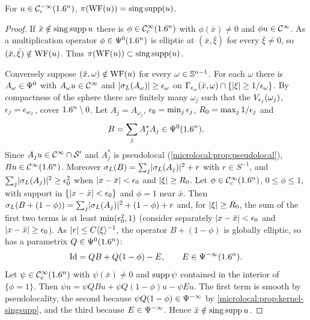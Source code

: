 \begin{proposition}\label{microlocal:prop:wf-singsupp}
  For $u\in\mathcal{C}^{-\infty}_{\mathrm{c}}(1.6^n)$, $\pi(\operatorname{WF}(u))=\operatorname{sing\,supp}(u)$.
\end{proposition}
\begin{proof}
  If $\bar x\notin\operatorname{sing\,supp} u$ there is $\phi\in\mathcal{C}^\infty_{\mathrm{c}}(1.6^n)$ with
  $\phi(\bar x)\ne0$ and $\phi u\in\mathcal{C}^\infty$. As a multiplication operator
  $\phi\in\Psi^{0}(1.6^n)$ is elliptic at $(\bar x,\bar\xi)$ for every
  $\bar\xi\ne0$, so $(\bar x,\bar\xi)\notin\operatorname{WF}(u)$. Thus
  $\pi(\operatorname{WF}(u))\subset\operatorname{sing\,supp}(u)$.

  Conversely suppose $(\bar x,\omega)\notin\operatorname{WF}(u)$ for every
  $\omega\in\mathbb{S}^{n-1}$. For each $\omega$ there is $A_\omega\in\Psi^{0}$
  with $A_\omega u\in\mathcal{C}^\infty$ and $\lvert \sigma_L(A_\omega)\rvert\ge\epsilon_\omega$ on
  $\Gamma_{\epsilon_\omega}(\bar x,\omega)\cap\{\lvert \xi\rvert\ge1/\epsilon_\omega\}$. By
  compactness of the sphere there are finitely many $\omega_j$ such that the
  $V_{\epsilon_j}(\omega_j)$, $\epsilon_j=\epsilon_{\omega_j}$, cover $1.6^n\setminus0$. Let
  $A_j=A_{\omega_j}$, $\epsilon_0=\min_j\epsilon_j$, $R_0=\max_j1/\epsilon_j$ and
  \begin{equation*}
    B=\sum_jA_j^*A_j\in\Psi^{0}(1.6^n).
  \end{equation*}
  Since $A_ju\in\mathcal{C}^\infty\cap\mathcal{S}'$ and $A_j^*$ is pseudolocal
  (\cref{microlocal:prop:pseudolocal}), $Bu\in\mathcal{C}^\infty(1.6^n)$. Moreover
  $\sigma_L(B)=\sum_j\lvert \sigma_L(A_j)\rvert^2+r$ with $r\in S^{-1}$, and
  $\sum_j\lvert \sigma_L(A_j)\rvert^2\ge\epsilon_0^2$ when $\lvert x-\bar x\rvert<\epsilon_0$ and
  $\lvert \xi\rvert\ge R_0$. Let $\phi\in\mathcal{C}^\infty_{\mathrm{c}}(1.6^n)$, $0\le\phi\le1$, with support in
  $\{\lvert x-\bar x\rvert<\epsilon_0\}$ and $\phi=1$ near $\bar x$. Then
  $\sigma_L(B+(1-\phi))=\sum_j\lvert \sigma_L(A_j)\rvert^2+(1-\phi)+r$ and, for
  $\lvert \xi\rvert\ge R_0$, the sum of the first two terms is at least
  $\min(\epsilon_0^2,1)$ (consider separately $\lvert x-\bar x\rvert<\epsilon_0$ and
  $\lvert x-\bar x\rvert\ge\epsilon_0$). As $\lvert r\rvert\le C\langle \xi\rangle^{-1}$, the operator
  $B+(1-\phi)$ is globally elliptic, so has a parametrix
  $Q\in\Psi^{0}(1.6^n)$:
  \begin{equation*}
    \operatorname{Id}=QB+Q(1-\phi)-E,\qquad E\in\Psi^{-\infty}(1.6^n).
  \end{equation*}
  Let $\psi\in\mathcal{C}^\infty_{\mathrm{c}}(1.6^n)$ with $\psi(\bar x)\ne0$ and $\operatorname{supp}\psi$ contained in
  the interior of $\{\phi=1\}$. Then
  $\psi u=\psi QBu+\psi Q(1-\phi)u-\psi Eu$. The first term is smooth by
  pseudolocality, the second because $\psi Q(1-\phi)\in\Psi^{-\infty}$ by
  \cref{microlocal:prop:kernel-singsupp}, and the third because
  $E\in\Psi^{-\infty}$. Hence $\bar x\notin\operatorname{sing\,supp} u$.
\end{proof}

